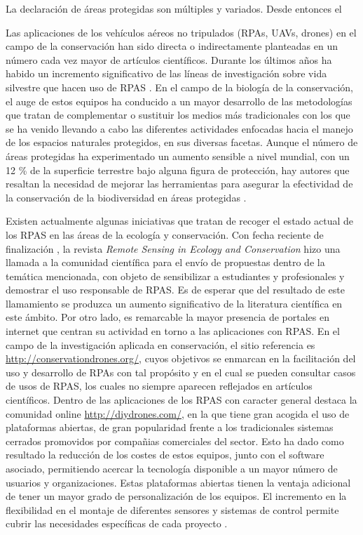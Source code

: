 \documentclass[11pt,]{article}
\begin{document}
La declaración de áreas protegidas son múltiples y variados. Desde
entonces el

Las aplicaciones de los vehículos aéreos no tripulados (RPAs, UAVs,
drones) en el campo de la conservación han sido directa o indirectamente
planteadas en un número cada vez mayor de artículos científicos. Durante
los últimos años ha habido un incremento significativo de las líneas de
investigación sobre vida silvestre que hacen uso de RPAS
\citep{Linchant2015}. En el campo de la biología de la conservación, el
auge de estos equipos ha conducido a un mayor desarrollo de las
metodologías que tratan de complementar o sustituir los medios más
tradicionales con los que se ha venido llevando a cabo las diferentes
actividades enfocadas hacia el manejo de los espacios naturales
protegidos, en sus diversas facetas. Aunque el número de áreas
protegidas ha experimentado un aumento sensible a nivel mundial, con un
12 \% de la superficie terrestre bajo alguna figura de protección, hay
autores que resaltan la necesidad de mejorar las herramientas para
asegurar la efectividad de la conservación de la biodiversidad en áreas
protegidas \citep{Chape2005}.

Existen actualmente algunas iniciativas que tratan de recoger el estado
actual de los RPAS en las áreas de la ecología y conservación. Con fecha
reciente de finalización , la revista \emph{Remote Sensing in Ecology
and Conservation} hizo una llamada a la comunidad científica para el
envío de propuestas dentro de la temática mencionada, con objeto de
sensibilizar a estudiantes y profesionales y demostrar el uso
responsable de RPAS. Es de esperar que del resultado de este llamamiento
se produzca un aumento significativo de la literatura científica en este
ámbito. Por otro lado, es remarcable la mayor presencia de portales en
internet que centran su actividad en torno a las aplicaciones con RPAS.
En el campo de la investigación aplicada en conservación, el sitio
referencia es \url{http://conservationdrones.org/}, cuyos objetivos se
enmarcan en la facilitación del uso y desarrollo de RPAs con tal
propósito y en el cual se pueden consultar casos de usos de RPAS, los
cuales no siempre aparecen reflejados en artículos científicos. Dentro
de las aplicaciones de los RPAS con caracter general destaca la
comunidad online \url{http://diydrones.com/}, en la que tiene gran
acogida el uso de plataformas abiertas, de gran popularidad frente a los
tradicionales sistemas cerrados promovidos por compañias comerciales del
sector. Esto ha dado como resultado la reducción de los costes de estos
equipos, junto con el software asociado, permitiendo acercar la
tecnología disponible a un mayor número de usuarios y organizaciones.
Estas plataformas abiertas tienen la ventaja adicional de tener un mayor
grado de personalización de los equipos. El incremento en la
flexibilidad en el montaje de diferentes sensores y sistemas de control
permite cubrir las necesidades específicas de cada proyecto
\citep{Koh2012}.
\end{document}
